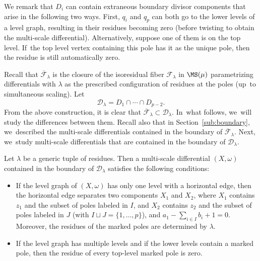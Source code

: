 We remark that $D_i$ can contain extraneous boundary divisor components that arise in the following two ways. First, $q_i$ and $q_p$ can both go to the lower levels of a level graph, resulting in their residues becoming zero (before twisting to obtain the multi-scale differential). Alternatively, suppose one of them is on the top level. If~the top level vertex containing this pole has it as the unique pole, then the residue is still automatically zero.

Recall that $\overline{\mathcal F}_{\lambda}$ is the closure of the isoresidual fiber $\mathcal F_\lambda$ in $\MS(\mu)$ parametrizing differentials with $\lambda$ as the prescribed configuration of residues at the poles (up~to simultaneous scaling). Let\vspace*{-3pt}
\[
\mathcal D_\lambda = D_1\cap \cdots \cap D_{p-2}.
\]
From the above construction, it is clear that
$\overline{\mathcal F}_\lambda\subset \mathcal D_\lambda$. In~what follows, we~will study the differences between them. Recall also that in Section~\ref{sub:boundary}, we~described the multi-scale differentials contained in the boundary of $\overline{\mathcal F}_{\lambda}$. Next, we~study multi-scale differentials that are contained in the boundary of $\mathcal D_\lambda$.

\begin{prop}
\label{prop:boundary}
Let $\lambda$ be a generic tuple of residues.
Then a multi-scale differential $(X,\omega)$ contained in the boundary of $\mathcal D_\lambda$ satisfies the following conditions:
\begin{itemize}
\item If the level graph of $(X,\omega)$ has only one level with a horizontal edge, then the horizontal edge separates two components $X_1$ and $X_2$, where $X_1$ contains $z_1$ and the subset of poles labeled in $I$, and $X_2$ contains $z_2$ and the subset of poles labeled in $J$ (with $I\sqcup J = \{1,\ldots,p\}$), and $a_1 - \sum_{i\in I} b_i + 1 = 0$. Moreover, the residues of the marked poles are determined by $\lambda$.
\item If the level graph has multiple levels and if the lower levels contain a marked pole, then the residue of every top-level marked pole is zero.
\end{itemize}
\end{prop}

